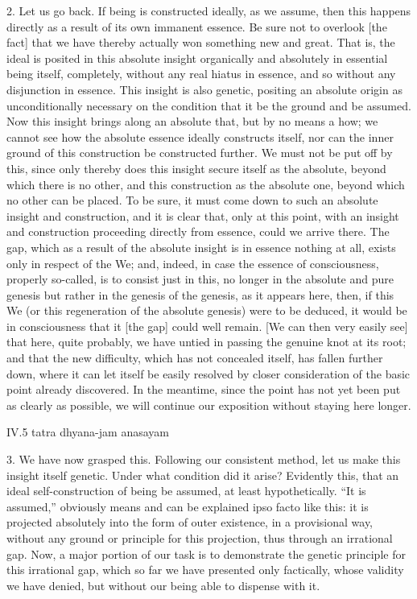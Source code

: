 2. Let us go back.
If being is constructed ideally, as we assume,
then this happens directly as
a result of its own immanent essence.
Be sure not to overlook [the fact] that we have thereby
actually won something new and great.
That is, the ideal is posited in this absolute insight
organically and absolutely in essential being itself,
completely, without any real hiatus in essence,
and so without any disjunction in essence.
This insight is also genetic,
positing an absolute origin as unconditionally necessary
on the condition that it be the ground and be assumed.
Now this insight brings along an absolute that,
but by no means a how; we cannot see how
the absolute essence ideally constructs itself,
nor can the inner ground of this construction be constructed further.
We must not be put off by this,
since only thereby does
this insight secure itself as the absolute,
beyond which there is no other,
and this construction as the absolute one,
beyond which no other can be placed.
To be sure, it must come down to such
an absolute insight and construction,
and it is clear that, only at this point,
with an insight and construction proceeding
directly from essence, could we arrive there.
The gap, which as a result of
the absolute insight is in essence nothing at all,
exists only in respect of the We;
and, indeed, in case the essence of consciousness,
properly so-called, is to consist just in this,
no longer in the absolute and pure genesis
but rather in the genesis of the genesis, as it appears here,
then, if this We (or this regeneration of the absolute genesis)
were to be deduced, it would be in consciousness
that it [the gap] could well remain.
[We can then very easily see] that here, quite probably,
we have untied in passing the genuine knot at its root;
and that the new difficulty,
which has not concealed itself,
has fallen further down,
where it can let itself
be easily resolved by closer consideration
of the basic point already discovered.
In the meantime, since the point has
not yet been put as clearly as possible,
we will continue our exposition without staying here longer.

IV.5
tatra dhyana-jam anasayam

3. We have now grasped this.
Following our consistent method,
let us make this insight itself genetic.
Under what condition did it arise?
Evidently this, that an ideal
self-construction of being be assumed,
at least hypothetically.
“It is assumed,” obviously means and
can be explained ipso facto like this:
it is projected absolutely
into the form of outer existence,
in a provisional way,
without any ground or principle
for this projection,
thus through an irrational gap.
Now, a major portion of our task is
to demonstrate the genetic principle
for this irrational gap,
which so far we have presented only factically,
whose validity we have denied,
but without our being able to dispense with it.

